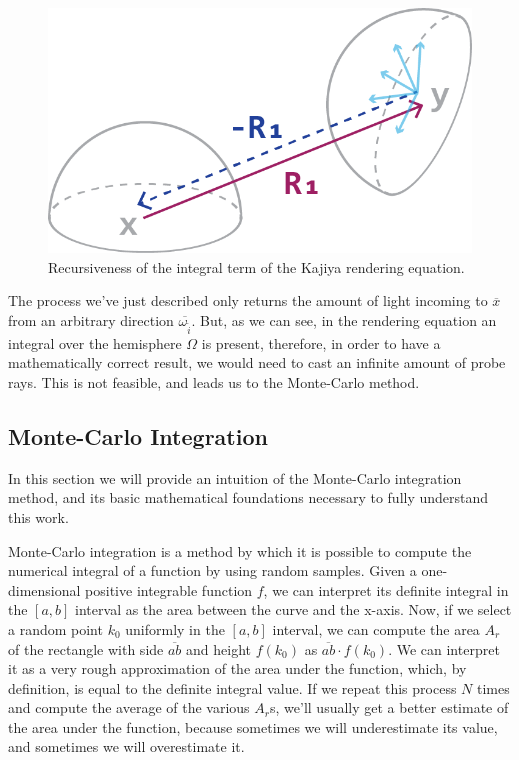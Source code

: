 \documentclass{PoliMi_MasterThesis}
\begin{document}
\begin{figure}[H]
    \centering
    \includegraphics[width=\textwidth*\real{0.45}]{Images/kajiya_recursive.png}
    \caption{Recursiveness of the integral term of the Kajiya rendering equation.}
    \label{fig:kajiya_recursiveness}
\end{figure}

The process we've just described only returns the amount of light incoming to $\overline{x}$ from an arbitrary direction $\overline{\omega_{\tilde{i}}}$. But, as we can see, in the rendering equation an integral over the hemisphere $\Omega$ is present, therefore, in order to have a mathematically correct result, we would need to cast an infinite amount of probe rays. This is not feasible, and leads us to the Monte-Carlo method.

\subsection{Monte-Carlo Integration} 
In this section we will provide an intuition of the Monte-Carlo integration method, and its basic mathematical foundations necessary to fully understand this work.

Monte-Carlo integration \cite{monte_carlo_integration} is a method by which it is possible to compute the numerical integral of a function by using random samples.
Given a one-dimensional positive integrable function $f$, we can interpret its definite integral in the $[a,b]$ interval as the area between the curve and the x-axis.
Now, if we select a random point $k_0$ uniformly in the $[a,b]$ interval, we can compute the area $A_r$ of the rectangle with side $\overline{ab}$ and height $f(k_0)$ as $\overline{ab} \cdot f(k_0)$. We can interpret it as a very rough approximation of the area under the function, which, by definition, is equal to the definite integral value. If we repeat this process $N$ times and compute the average of the various $A_r$s, we'll usually get a better estimate of the area under the function, because sometimes we will underestimate its value, and sometimes we will overestimate it.
\end{document}
